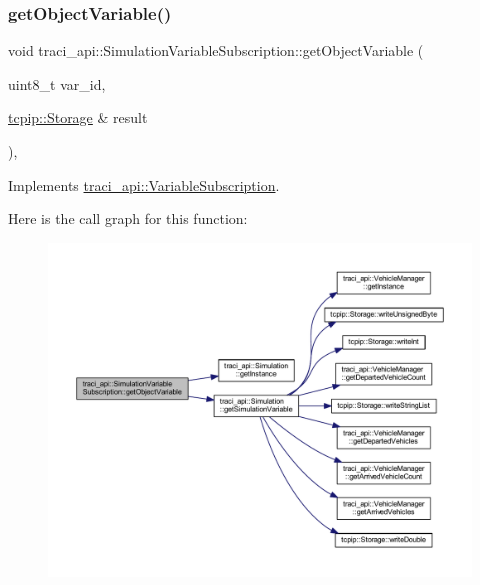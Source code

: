 \subsubsection{\texorpdfstring{get\+Object\+Variable()}{getObjectVariable()}}
{\footnotesize\ttfamily void traci\+\_\+api\+::\+Simulation\+Variable\+Subscription\+::get\+Object\+Variable (\begin{DoxyParamCaption}\item[{uint8\+\_\+t}]{var\+\_\+id,  }\item[{\hyperlink{classtcpip_1_1_storage}{tcpip\+::\+Storage} \&}]{result }\end{DoxyParamCaption})\hspace{0.3cm}{\ttfamily [override]}, {\ttfamily [virtual]}}



Implements \hyperlink{classtraci__api_1_1_variable_subscription_a884dba03a44455e86c417c3641ec6aa4}{traci\+\_\+api\+::\+Variable\+Subscription}.

Here is the call graph for this function\+:
\nopagebreak
\begin{figure}[H]
\begin{center}
\leavevmode
\includegraphics[width=350pt]{classtraci__api_1_1_simulation_variable_subscription_aaa64f6368289ff45730d718e3f38f762_cgraph}
\end{center}
\end{figure}
\mbox{\label{classtraci__api_1_1_simulation_variable_subscription_a1f5a6a5d62fe7a054f87311b0c5b6f5f}} 
